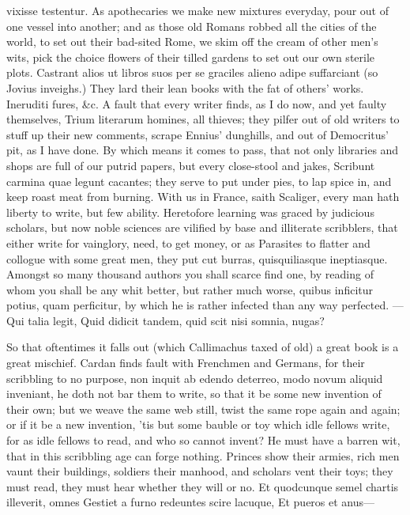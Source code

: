 {vixisse testentur. As apothecaries we make new mixtures everyday, pour
out of one vessel into another; and as those old Romans robbed all the
cities of the world, to set out their bad-sited Rome, we skim off the
cream of other men's wits, pick the choice flowers of their tilled
gardens to set out our own sterile plots. Castrant alios ut libros suos
per se graciles alieno adipe suffarciant (so Jovius inveighs.) They
lard their lean books with the fat of others' works. Ineruditi fures,
\&c. A fault that every writer finds, as I do now, and yet faulty
themselves, Trium literarum homines, all thieves; they pilfer out
of old writers to stuff up their new comments, scrape Ennius'
dunghills, and out of Democritus' pit, as I have done. By which
means it comes to pass, that not only libraries and shops are full
of our putrid papers, but every close-stool and jakes, Scribunt carmina
quae legunt cacantes; they serve to put under pies, to lap spice
in, and keep roast meat from burning. With us in France, saith
Scaliger, every man hath liberty to write, but few ability.
Heretofore learning was graced by judicious scholars, but now noble
sciences are vilified by base and illiterate scribblers, that either
write for vainglory, need, to get money, or as Parasites to flatter and
collogue with some great men, they put cut burras, quisquiliasque
ineptiasque. Amongst so many thousand authors you shall scarce find
one, by reading of whom you shall be any whit better, but rather much
worse, quibus inficitur potius, quam perficitur, by which he is rather
infected than any way perfected.
---Qui talia legit,
Quid didicit tandem, quid scit nisi somnia, nugas?

So that oftentimes it falls out (which Callimachus taxed of old) a
great book is a great mischief. Cardan finds fault with Frenchmen
and Germans, for their scribbling to no purpose, non inquit ab edendo
deterreo, modo novum aliquid inveniant, he doth not bar them to write,
so that it be some new invention of their own; but we weave the same
web still, twist the same rope again and again; or if it be a new
invention, 'tis but some bauble or toy which idle fellows write, for as
idle fellows to read, and who so cannot invent? He must have a
barren wit, that in this scribbling age can forge nothing. Princes
show their armies, rich men vaunt their buildings, soldiers their
manhood, and scholars vent their toys; they must read, they must hear
whether they will or no.
Et quodcunque semel chartis illeverit, omnes
Gestiet a furno redeuntes scire lacuque,
Et pueros et anus---

}
